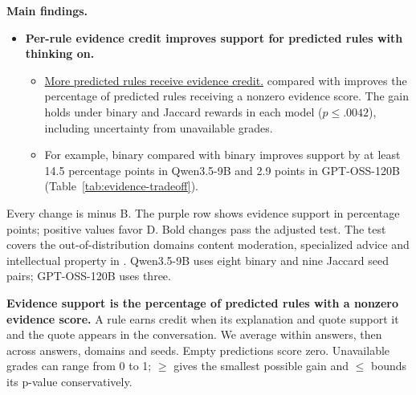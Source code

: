\begingroup\fontsize{9.3}{10.6}\selectfont\setlength{\parskip}{0.12em}
\textbf{Main findings.}
\begin{itemize}
\item \textbf{Per-rule evidence credit improves support for predicted rules with thinking on.}
\begin{itemize}
\item \underline{More predicted rules receive evidence credit.} \armD{} compared with \armB{} improves the percentage of predicted rules receiving a nonzero evidence score. The gain holds under binary and Jaccard rewards in each model ($p\leq.0042$), including uncertainty from unavailable grades.
\item For example, binary \armD{} compared with binary \armB{} improves support by at least 14.5 percentage points in Qwen3.5-9B and 2.9 points in GPT-OSS-120B (Table~\ref{tab:evidence-tradeoff}).
\end{itemize}
\end{itemize}
 Every change is \armD{} minus B. The purple row shows evidence support in percentage points; positive values favor D. Bold changes pass the adjusted test. The test covers the out-of-distribution domains content moderation, specialized advice and intellectual property in \SP{}. Qwen3.5-9B uses eight binary and nine Jaccard seed pairs; GPT-OSS-120B uses three.
\par\smallskip\par\smallskip
{\small \textbf{Evidence support is the percentage of predicted rules with a nonzero evidence score.} A rule earns credit when its explanation and quote support it and the quote appears in the conversation. We average within answers, then across answers, domains and seeds. Empty predictions score zero. Unavailable grades can range from 0 to 1; $\geq$ gives the smallest possible gain and $\leq$ bounds its p-value conservatively.}
